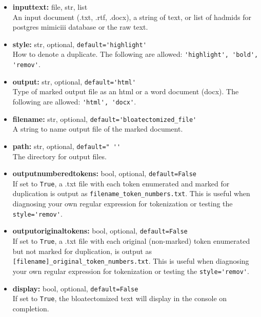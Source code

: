 \documentclass[runningheads,a4paper]{llncs}
\begin{document}
\begin{itemize}
\medskip

\item
\textbf{input\textunderscore text:} file, str, list  \\
An input document (.txt, .rtf, .docx), a string of text, or list of hadm\textunderscore ids for postgres mimiciii database or the raw text.
\medskip

\item
\textbf{style:} str, optional, \verb|default='highlight'|  \\
How to denote a duplicate. The following are allowed: \verb|'highlight', 'bold', 'remov'|.
\medskip

\item
\textbf{output:} str, optional, \verb|default='html'|  \\
Type of marked output file as an html or a word document (docx). The following are allowed: \verb|'html', 'docx'|.
\medskip

\item
\textbf{filename:} str, optional, \verb|default='bloatectomized_file'|\\
A string to name output file of the marked document.
\medskip

\item
\textbf{path:} str, optional, \verb|default=" ''|  \\
The directory for output files.
\medskip

\item
\textbf{output\textunderscore numbered\textunderscore tokens:} bool, optional, \verb|default=False|  \\
If set to \verb|True|, a .txt file with each token enumerated and marked for duplication is output as \verb|filename_token_numbers.txt|. This is useful when diagnosing your own regular expression for tokenization or testing the \verb|style='remov'|.
\medskip

\item
\textbf{output\textunderscore original\textunderscore tokens:} bool, optional, \verb|default=False|  \\
If set to  \verb|True|, a .txt file with each original (non-marked) token enumerated but not marked for duplication, is output as \verb|[filename]_original_token_numbers.txt|. This is useful when diagnosing your own regular expression for tokenization or testing the \verb|style='remov'|.
\medskip

\item
\textbf{display:} bool, optional, \verb|default=False| \\
If set to \verb|True|, the bloatectomized text will display in the console on completion.
\medskip


\end{itemize}
\end{document}
